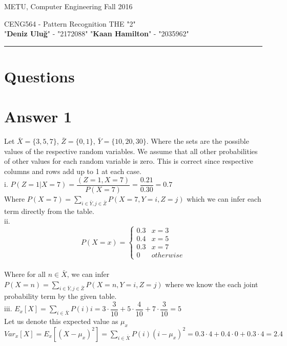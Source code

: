 \documentclass[12pt]{article}
\newcommand{\myheader}[4]
{\vspace*{-0.5in}
\noindent
{#1} \hfill {#3}

\noindent
{#2} \hfill {#4}

\noindent
\rule[8pt]{\textwidth}{1pt}

\vspace{1ex} 
}  %
\newcommand{\myalgsheader}[0]
{\myheader{METU, Computer Engineering}
{CENG564 - Pattern Recognition THE "2" \\ "{\bf Deniz Uluğ}"  - "2172088" "{\bf Kaan Hamilton}"  - "2035962"} {Fall 2016}{}}
\begin{document}
\myalgsheader
{}
\pagestyle{plain}



\section*{Questions} 

\section*{Answer 1}

Let $\bar{X} = \{3,5,7\}$, $\bar{Z} = \{0,1\}$, $\bar{Y} = \{10,20,30\}$. Where the sets are the possible values of the respective random variables. We assume that all other probabilities of other values for each random variable is zero. This is correct since respective columns and rows add up to 1 at each case.\\

i. $P(Z=1 | X=7) =  \dfrac{(Z=1, X=7)}{P(X=7)} = \dfrac{0.21}{0.30}=0.7$ \\ Where $P(X=7) = \sum_{i\in \bar{Y},j\in \bar{Z}  } P(X=7,Y=i,Z=j)$ which we can infer each term directly from the table.\\

ii. 
\[ P(X=x) = \begin{cases} 
      0.3 & x = 3 \\
      0.4 & x=5 \\
      0.3 & x=7 \\
      0 & otherwise 
   \end{cases}
\] \\

    Where for all $n \in \bar{X}$, we can infer $P(X=n) = \sum_{i\in \bar{Y},j\in \bar{Z}  } P(X=n,Y=i,Z=j)$ where we know the each joint probability term by the given table.\\
    
        iii. 
    $E_x[X] = \sum_{i\in\bar{X}} P(i)i = 3 \cdot \dfrac{3}{10}+ 5\cdot \dfrac{4}{10}+ 7\cdot \dfrac{3}{10} = 5 $ \\
    
    Let us denote this expected value as $\mu_x$ \\
    
    $Var_x[X] = E_x[ (X - \mu_x)^2 ] = \sum_{i\in\bar{X}} P( i )(i-\mu_x)^2 = 0.3\cdot 4 + 0.4\cdot 0 + 0.3 \cdot 4 = 2.4$ \\
    
\end{document}

